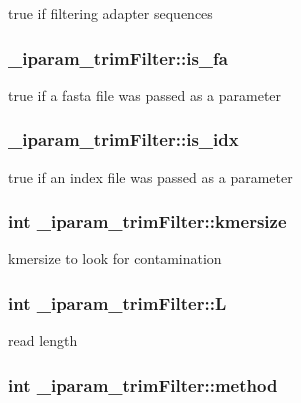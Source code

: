 true if filtering adapter sequences \hypertarget{struct__iparam__trimFilter_ac6093d26e41e61f82ffd2aa05f563f9c}{
\subsubsection[{is\+\_\+fa}]{ \+\_\+iparam\+\_\+trim\+Filter\+::is\+\_\+fa}}\label{struct__iparam__trimFilter_ac6093d26e41e61f82ffd2aa05f563f9c}
true if a fasta file was passed as a parameter \hypertarget{struct__iparam__trimFilter_afc50c477a3340ed7befc430d273ff6cb}{
\subsubsection[{is\+\_\+idx}]{ \+\_\+iparam\+\_\+trim\+Filter\+::is\+\_\+idx}}\label{struct__iparam__trimFilter_afc50c477a3340ed7befc430d273ff6cb}
true if an index file was passed as a parameter \hypertarget{struct__iparam__trimFilter_a6a1118d39cdaa79f48f2d010a6018e5c}{
\subsubsection[{kmersize}]{\setlength{\rightskip}{0pt plus 5cm}int \+\_\+iparam\+\_\+trim\+Filter\+::kmersize}}\label{struct__iparam__trimFilter_a6a1118d39cdaa79f48f2d010a6018e5c}
kmersize to look for contamination \hypertarget{struct__iparam__trimFilter_a72fcc236d4136d2405a04f155b515894}{
\subsubsection[{L}]{\setlength{\rightskip}{0pt plus 5cm}int \+\_\+iparam\+\_\+trim\+Filter\+::\+L}}\label{struct__iparam__trimFilter_a72fcc236d4136d2405a04f155b515894}
read length \hypertarget{struct__iparam__trimFilter_a0b5f9bed4a7b4e2de8c917b42360f4d3}{
\subsubsection[{method}]{\setlength{\rightskip}{0pt plus 5cm}int \+\_\+iparam\+\_\+trim\+Filter\+::method}}\label{struct__iparam__trimFilter_a0b5f9bed4a7b4e2de8c917b42360f4d3}
